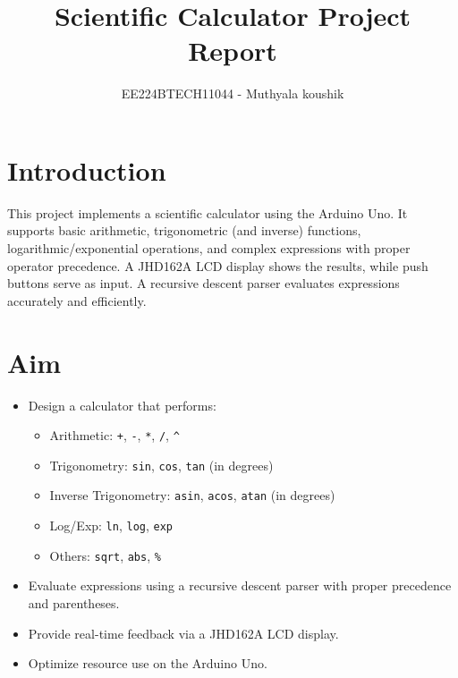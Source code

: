 \documentclass{article}
\theoremstyle{remark}
\begin{document}

\vspace{3cm}

\title{Scientific Calculator Project Report}
\author{EE224BTECH11044 - Muthyala koushik%
}
\date{}
\maketitle
\bigskip



\renewcommand{\thefigure}{\theenumi}
\renewcommand{\thetable}{\theenumi}



\section{Introduction}
This project implements a scientific calculator using the Arduino Uno. It supports basic arithmetic, trigonometric (and inverse) functions, logarithmic/exponential operations, and complex expressions with proper operator precedence. A JHD162A LCD display shows the results, while push buttons serve as input. A recursive descent parser evaluates expressions accurately and efficiently.

\section{Aim}
\begin{itemize}[noitemsep]
    \item Design a calculator that performs:
    \begin{itemize}[noitemsep]
        \item Arithmetic: \texttt{+}, \texttt{-}, \texttt{*}, \texttt{/}, \texttt{\textasciicircum}
        \item Trigonometry: \texttt{sin}, \texttt{cos}, \texttt{tan} (in degrees)
        \item Inverse Trigonometry: \texttt{asin}, \texttt{acos}, \texttt{atan} (in degrees)
        \item Log/Exp: \texttt{ln}, \texttt{log}, \texttt{exp}
        \item Others: \texttt{sqrt}, \texttt{abs}, \texttt{\%}
    \end{itemize}
    \item Evaluate expressions using a recursive descent parser with proper precedence and parentheses.
    \item Provide real-time feedback via a JHD162A LCD display.
    \item Optimize resource use on the Arduino Uno.
\end{itemize}
\end{document}
